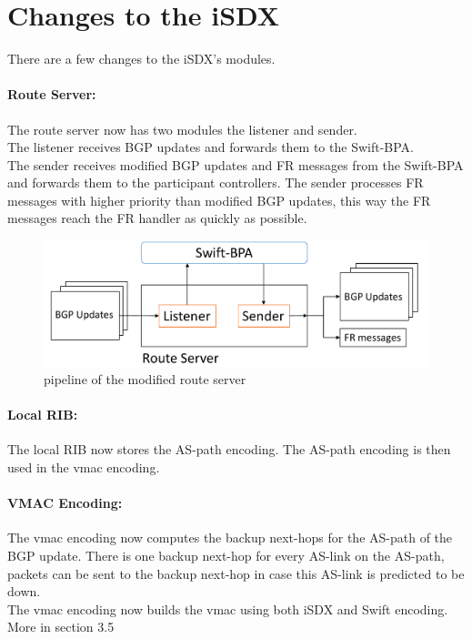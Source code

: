\newpage

\section{\label{chapter3:Changes to the iSDX}Changes to the iSDX}

There are a few changes to the iSDX's modules. 

\paragraph{\label{chapter3:Changes to the iSDX:route server}Route Server:}

The route server now has two modules the listener and sender. \\
The listener receives BGP updates and forwards them to the Swift-BPA. \\
The sender receives modified BGP updates and FR messages from the Swift-BPA and forwards them to the participant controllers. The sender processes FR messages with higher priority than modified BGP updates, this way the FR messages reach the FR handler as quickly as possible. 

\begin{figure}[h]
\center
\includegraphics[scale = 0.45]{Figures/design_route_server_cropped2.pdf}
\caption{pipeline of the modified route server}
\end{figure}


\paragraph{\label{chapter3:Changes to the iSDX:local RIB}Local RIB:}
The local RIB now stores the AS-path encoding. The AS-path encoding is then used in the vmac encoding. 

\paragraph{\label{chapter3:Changes to the iSDX:Vmac Encoding}VMAC Encoding:}
The vmac encoding now computes the backup next-hops for the AS-path of the BGP update. There is one backup next-hop for every AS-link on the AS-path, packets can be sent to the backup next-hop in case this AS-link is predicted to be down. \\
The vmac encoding now builds the vmac using both iSDX and Swift encoding. \\
More in section 3.5 

